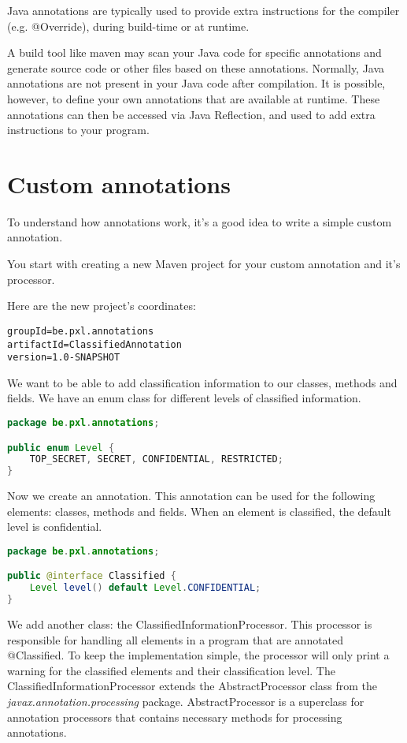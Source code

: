 Java annotations are typically used to provide extra instructions for the compiler (e.g. @Override),  during build-time or at runtime.

A build tool like maven may scan your Java code for specific annotations and generate source code or other files based on these annotations.  Normally, Java annotations are not present in your Java code after compilation. It is possible, however, to define your own annotations that are available at runtime. These annotations can then be accessed via Java Reflection, and used to add extra instructions to your program.

\section{Custom annotations}

To understand how annotations work, it's a good idea to write a simple custom annotation. 

You start with creating a new Maven project for your custom annotation and it's processor.

Here are the new project's coordinates:

\begin{verbatim}
groupId=be.pxl.annotations
artifactId=ClassifiedAnnotation
version=1.0-SNAPSHOT
\end{verbatim}


We want to be able to add classification information to our classes, methods and fields.
We have an enum class for different levels of classified information.

\begin{lstlisting}[frame=single,language=java]
package be.pxl.annotations;

public enum Level {
	TOP_SECRET, SECRET, CONFIDENTIAL, RESTRICTED;
}
\end{lstlisting}

Now we create an annotation. This annotation can be used for the following elements: classes,  methods and fields.  When an element is classified, the default level is confidential.

\begin{lstlisting}[frame=single,language=java]
package be.pxl.annotations;

public @interface Classified {
	Level level() default Level.CONFIDENTIAL;
}
\end{lstlisting}


We add another class: the ClassifiedInformationProcessor. This processor is responsible for handling all elements in a program that are annotated @Classified.
To keep the implementation simple, the processor will only print a warning for the classified elements and their classification level.
The ClassifiedInformationProcessor extends the AbstractProcessor class from the \textit{javax.annotation.processing} package. AbstractProcessor is a superclass for  annotation processors that contains necessary methods for processing annotations.


